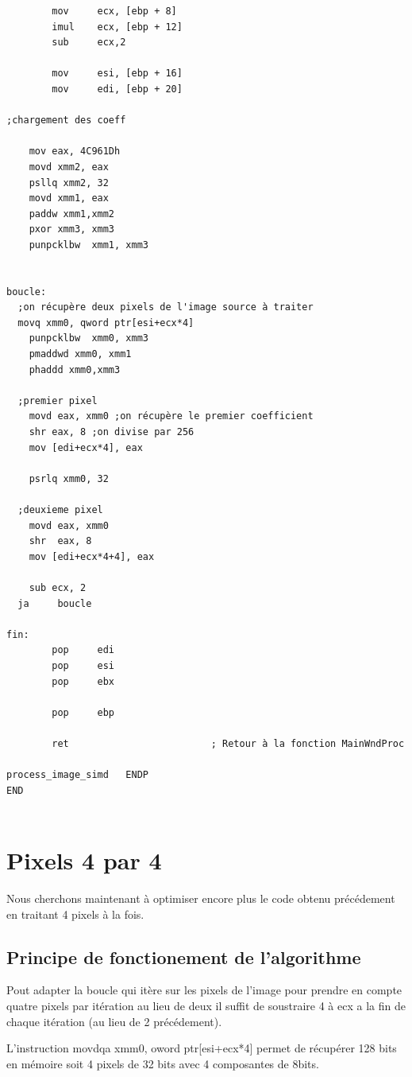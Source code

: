 \documentclass[11pt]{report}
\begin{document}
\begin{lstlisting}
        mov     ecx, [ebp + 8]
        imul    ecx, [ebp + 12]
		sub		ecx,2

        mov     esi, [ebp + 16]
        mov     edi, [ebp + 20]

;chargement des coeff

	mov eax, 4C961Dh
	movd xmm2, eax
	psllq xmm2, 32
	movd xmm1, eax
	paddw xmm1,xmm2
	pxor xmm3, xmm3
	punpcklbw  xmm1, xmm3


boucle:
  ;on récupère deux pixels de l'image source à traiter
  movq xmm0, qword ptr[esi+ecx*4]
	punpcklbw  xmm0, xmm3
	pmaddwd xmm0, xmm1
	phaddd xmm0,xmm3

  ;premier pixel
	movd eax, xmm0 ;on récupère le premier coefficient
	shr eax, 8 ;on divise par 256
	mov [edi+ecx*4], eax

	psrlq xmm0, 32

  ;deuxieme pixel
	movd eax, xmm0
	shr  eax, 8
	mov [edi+ecx*4+4], eax

	sub ecx, 2
  ja     boucle

fin:
        pop     edi
        pop     esi
        pop     ebx

        pop     ebp

        ret                         ; Retour à la fonction MainWndProc

process_image_simd   ENDP
END


\end{lstlisting}


\section{Pixels 4 par 4}

Nous cherchons maintenant à optimiser encore plus le code obtenu précédement en traitant 4 pixels à la fois. 

\subsection{Principe de fonctionement de l'algorithme}

Pout adapter la boucle qui itère sur les pixels de l’image pour prendre en compte quatre pixels par itération au lieu de deux il suffit de soustraire 4 à ecx a la fin de chaque itération (au lieu de 2 précédement).

L'instruction movdqa xmm0, oword ptr[esi+ecx*4] permet de récupérer 128 bits en mémoire soit 4 pixels de 32 bits avec 4 composantes de 8bits.
\end{document}

